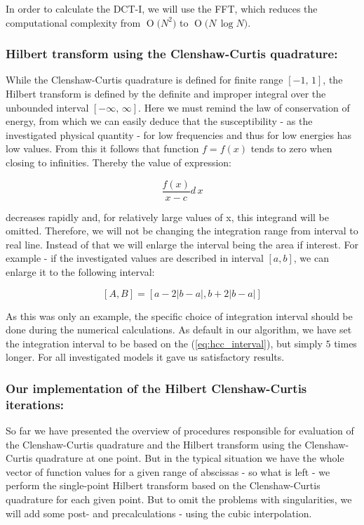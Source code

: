 \documentclass[12pt,twoside,a4paper]{article}
\numberwithin{equation}{subsection}
\numberwithin{figure}{subsection}
\newcommand{\BigO}[1]{\ensuremath{\operatorname{O}\bigl(#1\bigr)}}
\begin{document}
In order to calculate the DCT-I, we will use the FFT, which reduces the computational complexity from $\BigO{N^2}$ to $\BigO{N \, \log{N}}$.

\subsubsection*{Hilbert transform using the Clenshaw-Curtis quadrature:}

While the Clenshaw-Curtis quadrature is defined for finite range $[-1,\,1]$, the Hilbert transform is defined by the definite and improper integral over the unbounded interval $[-\infty,\, \infty]$. Here we must remind the law of conservation of energy, from which we can easily deduce that the susceptibility - as the investigated physical quantity - for low frequencies and thus for low energies has low values. From this it follows that function $f = f(x)$ tends to zero when closing to infinities. Thereby the value of expression:

\begin{equation} \label{eq:hcc_adapt}
  \frac{f(x)}{x-c} d \, x
\end{equation}

decreases rapidly and, for relatively large values of x, this integrand will be omitted. Therefore, we will not be changing the integration range from interval to real line. Instead of that we will enlarge the interval being the area if interest. For example - if the investigated values are described in interval $[a, b]$, we can enlarge it to the following interval:

\begin{equation} \label{eq:hcc_interval}
  [A, B] = [a - 2|b-a|, b + 2|b-a|] 
\end{equation}


As this was only an example, the specific choice of integration interval should be done during the numerical calculations. As default in our algorithm, we have set the integration interval to be based on the (\ref{eq:hcc_interval}), but simply $5$ times longer. For all investigated models it gave us satisfactory results.

\subsubsection*{Our implementation of the Hilbert Clenshaw-Curtis iterations:}

So far we have presented the overview of procedures responsible for evaluation of the Clenshaw-Curtis qua\-dra\-tu\-re and the Hil\-bert transform using the Clenshaw-Curtis qua\-dra\-ture at one point. But in the typical situation we have the whole vector of function values for a given range of abscissas - so what is left - we perform the single-point Hil\-bert transform based on the Clenshaw-Curtis qua\-dra\-ture for each given point. But to omit the problems with singularities, we will add some post- and precalculations - using the cubic interpolation. 
\end{document}
